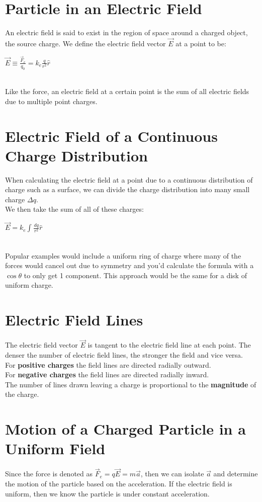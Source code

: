 \documentclass{report}
\begin{document}
	\section{Particle in an Electric Field}
		An electric field is said to exist in the region of space around a charged object, the source charge. We define the electric field vector $\vec{E}$ at a point to be:\\
		\centerline{$\vec{E} \equiv \frac{\vec{F}_e}{q_0} = k_e \frac{q}{r^2}\hat{r}$}\\
		Like the force, an electric field at a certain point is the sum of all electric fields due to multiple point charges.
	\section{Electric Field of a Continuous Charge Distribution}
		When calculating the electric field at a point due to a continuous distribution of charge such as a surface, we can divide the charge distribution into many small charge $\Delta q$.\\
		We then take the sum of all of these charges:\\
		\centerline{$\vec{E} = k_e \int_{}^{} \frac{dq}{r^2} \hat{r}$} \\
		Popular examples would include a uniform ring of charge where many of the forces would cancel out due to symmetry and you'd calculate the formula with a $\cos \theta$ to only get 1 component. This approach would be the same for a disk of uniform charge.
	\section{Electric Field Lines}
		The electric field vector $\vec{E}$ is tangent to the electric field line at each point. The denser the number of electric field lines, the stronger the field and vice versa.\\
		For \textbf{positive charges} the field lines are directed radially outward.\\
		For \textbf{negative charges} the field lines are directed radially inward.\\
		The number of lines drawn leaving a charge is proportional to the \textbf{magnitude} of the charge.
	\section{Motion of a Charged Particle in a Uniform Field}
		Since the force is denoted as $\vec{F}_e = q\vec{E} = m\vec{a}$, then we can isolate $\vec{a}$ and determine the motion of the particle based on the acceleration. If the electric field is uniform, then we know the particle is under constant acceleration.
\end{document}
